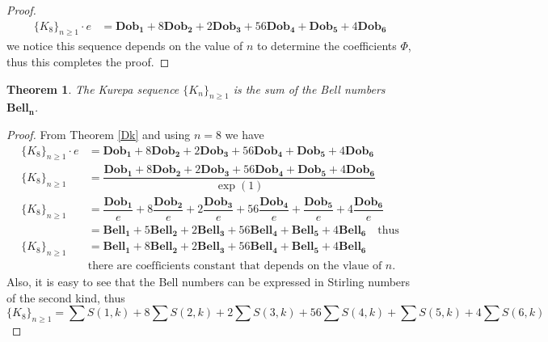 \documentclass[pdflatex,sn-mathphys-num]{sn-jnl}%
\newtheorem{theorem}{Theorem}
\theoremstyle{thmstyleone}%
\theoremstyle{thmstyletwo}%
\theoremstyle{thmstylethree}%
\begin{document}
\begin{proof}
\begin{align*}
 \lbrace K_8\rbrace_{n\geq 1}\cdotp e&= \mathbf{Dob_1} + 8\mathbf{Dob_2} + 2\mathbf{Dob_3} +56\mathbf{Dob_4} + \mathbf{Dob_5}+ 4\mathbf{Dob_6}
\end{align*}
we notice this sequence depends on the value of $n$ to determine the coefficients $\Phi$, thus this completes the proof.  
\end{proof}



\begin{theorem}\label{Belo}
The Kurepa sequence  $\lbrace K_n\rbrace_{n\geq 1}$ is the sum of the Bell numbers $ \mathbf{Bell_n}$. 
\end{theorem}

\begin{proof}
From Theorem \ref{Dk} and using $n=8$ we have
    \begin{align}
        \lbrace K_8\rbrace_{n\geq 1}\cdotp e &= \mathbf{Dob_1} + 8\mathbf{Dob_2} + 2\mathbf{Dob_3} +56\mathbf{Dob_4} + \mathbf{Dob_5}+ 4\mathbf{Dob_6}\\ \nonumber
       \lbrace K_8\rbrace_{n\geq 1} &= \dfrac{ \mathbf{Dob_1} + 8\mathbf{Dob_2} + 2\mathbf{Dob_3} +56\mathbf{Dob_4} + \mathbf{Dob_5}+ 4\mathbf{Dob_6}}{\exp(1)}\\ \nonumber
         \lbrace K_8\rbrace_{n\geq 1} &= \dfrac{\mathbf{Dob_1} }{e} + 8\dfrac{\mathbf{Dob_2}}{e} +2\dfrac{\mathbf{Dob_3}}{e}+ 56\dfrac{\mathbf{Dob_4}}{e}+ \dfrac{\mathbf{Dob_5}}{e}+ 4\dfrac{\mathbf{Dob_6}}{e}\\
    &= \mathbf{Bell_1}+ 5 \mathbf{Bell_2}  + 2 \mathbf{Bell_3} + 56\mathbf{Bell_4} + \mathbf{Bell_5} + 4\mathbf{Bell_6} \quad
\mbox{thus}\\ \nonumber
 \lbrace K_8\rbrace_{n\geq 1} &= \mathbf{Bell_1}+ 8 \mathbf{Bell_2}  + 2 \mathbf{Bell_3} + 56\mathbf{Bell_4}+ \mathbf{Bell_5} + 4\mathbf{Bell_6} \\
 &\mbox{there are coefficients constant that depends on the vlaue of $n$}.
    \end{align}
    Also, it is easy to see that the Bell numbers can be expressed in Stirling numbers of the second kind, thus
    $$\lbrace K_8\rbrace_{n\geq 1}= \sum S(1,k) + 8  \sum S(2,k)  + 2  \sum S(3,k)+ 56  \sum S(4,k)+ \sum S(5,k) + 4  \sum S(6,k) $$
\end{proof}
\end{document}
